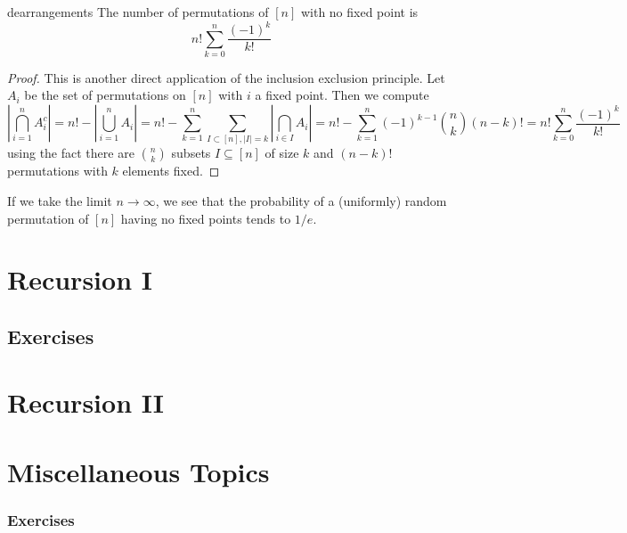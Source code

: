 \documentclass{article}
\newcounter{statementcount}
\begin{document}
\begin{proposition}[]{dearrangements}
    The number of permutations of $[n]$ with no fixed point is \[n!\sum_{k = 0}^n \frac{(-1)^k}{k!}\]
\end{proposition}

\begin{proof}
    This is another direct application of the inclusion exclusion principle. Let $A_i$ be the set of permutations 
    on $[n]$ with $i$ a fixed point. Then we compute
    \[
        \left|\bigcap_{i=1}^n A_i^c\right| = n! - \left|\bigcup_{i = 1}^n A_i\right| = n! - \sum_{k=1}^n
        \sum_{I \subset [n], |I| = k}\left|\bigcap_{i \in I}A_i\right| = n! - \sum_{k=1}^n (-1)^{k-1}\binom{n}{k}(n-k)! 
        = n! \sum_{k=0}^n \frac{(-1)^k}{k!}
    \]
    using the fact there are $\binom{n}{k}$ subsets $I \subseteq [n]$ of size $k$ and $(n-k)!$ permutations 
    with $k$ elements fixed. 
\end{proof}

If we take the limit $n \to \infty$, we see that the probability of a (uniformly) random permutation of $[n]$ having
no fixed points tends to $1/e$. 

\newpage

\section{Recursion I}

\setcounter{statementcount}{1}

\subsection*{Exercises}

\newpage

\section{Recursion II}

\setcounter{statementcount}{1}

\newpage 

\section{Miscellaneous Topics}

\subsubsection*{Exercises}
\end{document}
